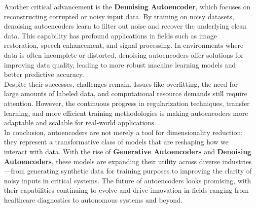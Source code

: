 \documentclass[a4paper,12pt]{article}
\begin{document}
Another critical advancement is the \textbf{Denoising Autoencoder}, which focuses on reconstructing corrupted or noisy input data. By training on noisy datasets, denoising autoencoders learn to filter out noise and recover the underlying clean data. This capability has profound applications in fields such as image restoration, speech enhancement, and signal processing. In environments where data is often incomplete or distorted, denoising autoencoders offer solutions for improving data quality, leading to more robust machine learning models and better predictive accuracy. \\[1em]

Despite their successes, challenges remain. Issues like overfitting, the need for large amounts of labeled data, and computational resource demands still require attention. However, the continuous progress in regularization techniques, transfer learning, and more efficient training methodologies is making autoencoders more adaptable and scalable for real-world applications. \\[1em]

In conclusion, autoencoders are not merely a tool for dimensionality reduction; they represent a transformative class of models that are reshaping how we interact with data. With the rise of \textbf{Generative Autoencoders} and \textbf{Denoising Autoencoders}, these models are expanding their utility across diverse industries—from generating synthetic data for training purposes to improving the clarity of noisy inputs in critical systems. The future of autoencoders looks promising, with their capabilities continuing to evolve and drive innovation in fields ranging from healthcare diagnostics to autonomous systems and beyond. \\[1em]

\nocite{*}

\end{document}

